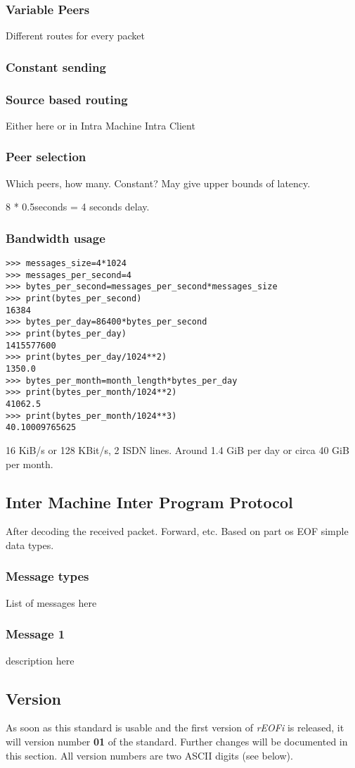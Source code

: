 \subsubsection{Variable Peers}
Different routes for every packet
\subsubsection{Constant sending}

\subsubsection{Source based routing}
Either here or in Intra Machine Intra Client
\subsubsection{Peer selection}
Which peers, how many. Constant? May give upper bounds of latency.

8 * 0.5seconds = 4 seconds delay.

\subsubsection{Bandwidth usage}
\begin{verbatim}
>>> messages_size=4*1024
>>> messages_per_second=4
>>> bytes_per_second=messages_per_second*messages_size
>>> print(bytes_per_second)
16384
>>> bytes_per_day=86400*bytes_per_second
>>> print(bytes_per_day)
1415577600
>>> print(bytes_per_day/1024**2)
1350.0
>>> bytes_per_month=month_length*bytes_per_day
>>> print(bytes_per_month/1024**2)
41062.5
>>> print(bytes_per_month/1024**3)
40.10009765625
\end{verbatim}
16 KiB/s or 128 KBit/s, 2 ISDN lines. Around 1.4 GiB per day or
circa 40 GiB per month.

\subsection{Inter Machine Inter Program Protocol}
After decoding the received packet. Forward, etc.
Based on part os EOF simple data types.
\subsubsection{Message types}
List of messages here
\subsubsection{Message 1}
description here

\subsection{Version}
As soon as this standard is usable and the first version of \emph{rEOFi}
is released, it will version number \textbf{01} of the standard.
Further changes will be documented in this section. All version numbers
are two ASCII digits (see below).

